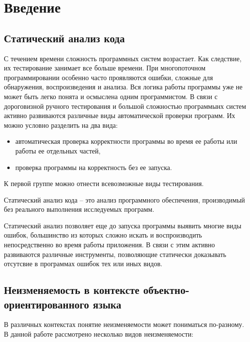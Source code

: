 \chapter{Введение}

\section{Статический анализ кода}

С течением времени сложность программных систем возрастает. Как следствие, их тестирование занимает все больше времени. При многопоточном программировании особенно часто проявляются ошибки, сложные для обнаружения, воспроизведения и анализа. Вся логика работы программы уже не может быть легко понята и осмыслена одним программистом. В связи с дороговизной ручного тестирования и большой сложностью программынх систем активно развиваются различные виды автоматической проверки программ. Их можно условно разделить на два вида:
\begin{itemize}
\item автоматическая проверка корректности программы во время ее работы или работы ее отдельных частей,
\item проверка программы на корректность без ее запуска.
\end{itemize}

К первой группе можно отнести всевозможные виды тестирования. 

\begin{Def}\label{static_program_analysis}
Статический анализ кода -- это анализ программного обеспечения, производимый без реального выполнения исследуемых программ.
\end{Def}

Статический анализ позволяет еще до запуска программы выявить многие виды ошибок, большинство из которых сложно искать и воспроизводить непосредственно во время работы приложения. В связи с этим активно развиваются различные инструменты, позволяющие статически доказывать отсутсвие в программах ошибок тех или иных видов.  



\section{Неизменяемость в контексте объектно-ори\-ентированного языка}

В различных контекстах понятие неизменяемости может пониматься по-разному. В данной работе рассмотрено несколько видов неизменяемости:

